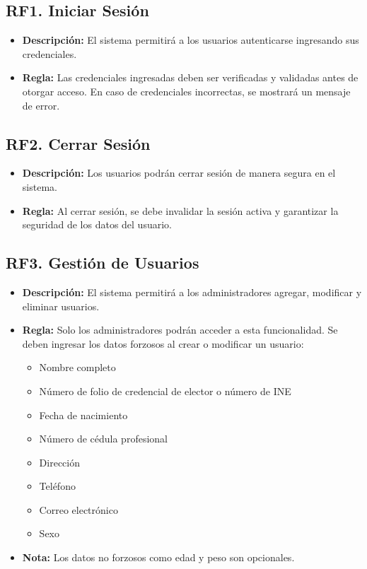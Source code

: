 \documentclass{article}
\begin{document}
\subsection{RF1. Iniciar Sesión}
\begin{itemize}
    \item \textbf{Descripción:} El sistema permitirá a los usuarios autenticarse ingresando sus credenciales.
    \item \textbf{Regla:} Las credenciales ingresadas deben ser verificadas y validadas antes de otorgar acceso. En caso de credenciales incorrectas, se mostrará un mensaje de error.
\end{itemize}

\subsection{RF2. Cerrar Sesión}
\begin{itemize}
    \item \textbf{Descripción:} Los usuarios podrán cerrar sesión de manera segura en el sistema.
    \item \textbf{Regla:} Al cerrar sesión, se debe invalidar la sesión activa y garantizar la seguridad de los datos del usuario.
\end{itemize}

\subsection{RF3. Gestión de Usuarios}
\begin{itemize}
    \item \textbf{Descripción:} El sistema permitirá a los administradores agregar, modificar y eliminar usuarios.
    \item \textbf{Regla:} Solo los administradores podrán acceder a esta funcionalidad. Se deben ingresar los datos forzosos al crear o modificar un usuario:
    \begin{itemize}
        \item Nombre completo
        \item Número de folio de credencial de elector o número de INE
        \item Fecha de nacimiento
        \item Número de cédula profesional
        \item Dirección
        \item Teléfono
        \item Correo electrónico
        \item Sexo
    \end{itemize}
    \item \textbf{Nota:} Los datos no forzosos como edad y peso son opcionales.
\end{itemize}
\end{document}
